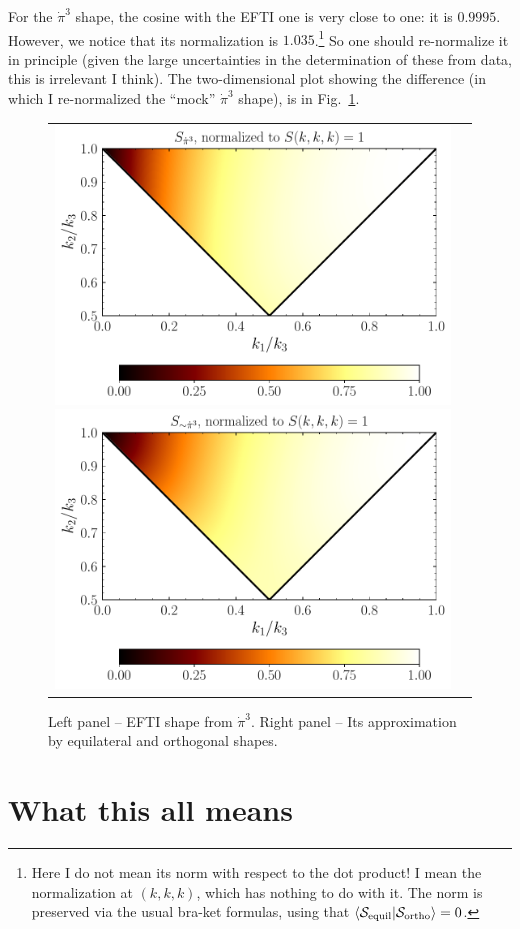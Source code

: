 \documentclass[aps,prd,amsmath,floats,floatfix,superscriptaddress,nofootinbib%
]{revtex4}%
\renewcommand\({\left(}
\renewcommand\){\right)}
\renewcommand\[{\left[}
\renewcommand\]{\right]}
\begin{document}
For the $\dot{\pi}^3$ shape, the cosine with the EFTI one is very close to one: it is $0.9995$. However, we notice that its normalization is $1.035$.\footnote{Here I do not mean its norm with respect to the dot product! I mean the normalization at $(k,k,k)$, which has nothing to do with it. The norm is preserved via the usual bra-ket formulas, using that $\braket{{\cal S}_{\rm equil}|{\cal S}_{\rm ortho}}=0$.} So one should re-normalize it in principle (given the large uncertainties in the determination of these from data, this is irrelevant I think). The two-dimensional plot showing the difference (in which I re-normalized the ``mock'' $\dot{\pi}^3$ shape), is in Fig.~\ref{fig:dotpicubed_comparison}. 
\begin{figure}[h!]
\centering
\begin{tabular}{cc}
\includegraphics[width=0.475\columnwidth]{plot_dotpicubed.pdf} 
\includegraphics[width=0.475\columnwidth]{plot_dotpicubedcombo.pdf}
\end{tabular}
\caption{{Left panel} -- EFTI shape from $\dot{\pi}^3$. 
{Right panel} -- Its approximation by equilateral and orthogonal shapes.} 
\label{fig:dotpicubed_comparison}
\end{figure} 


\section{What this all means}
\label{sec:what_this_means} 
\end{document}
